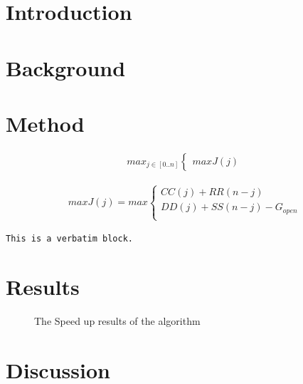 \section{Introduction}

\section{Background}

\section{Method}
  

\begin{align}
\label{MM}
	max_{j\in [0..n]}
 \begin{cases}
	 maxJ(j)
 \end{cases}
\end{align}

\begin{align}
\label{MM_2}
	maxJ(j) = max
 \begin{cases}
	 CC(j) + RR(n-j) \\
	 DD(j) + SS(n-j) - G_{open} \\
 \end{cases}
\end{align}

\begin{Verbatim}[frame=single, formatcom=\color{black}]
  This is a verbatim block.
\end{Verbatim}


\section{Results}
\begin{figure}[H]
    \centering
    \caption{The Speed up results of the algorithm\cite{cuda2}}
    \label{fig:cuda2_stages}
\end{figure}

\section{Discussion}



